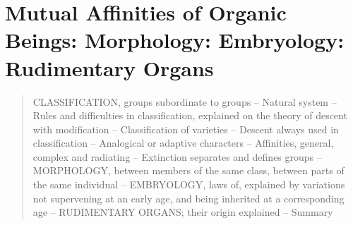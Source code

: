 \chapter{Mutual Affinities of Organic Beings: Morphology: Embryology: Rudimentary Organs}

\begin{quotation}
CLASSIFICATION, groups subordinate to groups -- Natural system -- Rules and difficulties in classification, explained on the theory of descent with modification -- Classification of varieties -- Descent always used in classification -- Analogical or adaptive characters -- Affinities, general, complex and radiating -- Extinction separates and defines groups 
-- MORPHOLOGY, between members of the same class, between parts of the same individual 
-- EMBRYOLOGY, laws of, explained by variations not supervening at an early age, and being inherited at a corresponding age 
-- RUDIMENTARY ORGANS; their origin explained -- Summary
\end{quotation}

